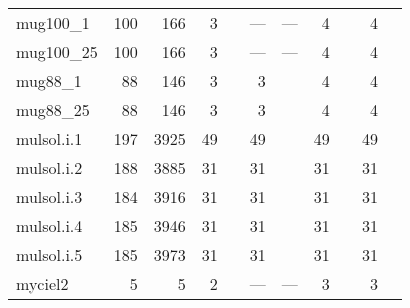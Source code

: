 \begin{longtable}{lrrrlrlrlrl}
  mug100\_1 & 100 & 166 & 3 & \cite{Malaguti2011} & --- & --- & 4 & \cite{Mendez-Diaz2006,Malaguti2011} & 4 & \cite{Malaguti2011,Mendez-Diaz2006,Brelaz1979,Sewell1996,Segundo2012} \\ 
  mug100\_25 & 100 & 166 & 3 & \cite{Malaguti2011} & --- & --- & 4 & \cite{Mendez-Diaz2006,Malaguti2011} & 4 & \cite{Malaguti2011,Mendez-Diaz2006,Brelaz1979,Sewell1996,Segundo2012} \\ 
  mug88\_1 & 88 & 146 & 3 & \cite{Malaguti2011,Gualandi2012} & 3 & \cite{Gualandi2012} & 4 & \cite{Mendez-Diaz2006,Malaguti2011,Gualandi2012} & 4 & \cite{Malaguti2011,Gualandi2012,Mendez-Diaz2006,Brelaz1979,Sewell1996,Segundo2012} \\ 
  mug88\_25 & 88 & 146 & 3 & \cite{Malaguti2011,Gualandi2012} & 3 & \cite{Gualandi2012} & 4 & \cite{Mendez-Diaz2006,Malaguti2011,Gualandi2012} & 4 & \cite{Mendez-Diaz2006,Malaguti2011,Gualandi2012,Mendez-Diaz2006,Brelaz1979,Sewell1996,Segundo2012} \\ 
  mulsol.i.1 & 197 & 3925 & 49 & \cite{Malaguti2011,Gualandi2012} & 49 & \cite{Gualandi2012} & 49 & \cite{Mehrotra1996,Malaguti2011,Gualandi2012,Mendez-Diaz2006} & 49 & \cite{Mehrotra1996,Malaguti2011,Gualandi2012,Mendez-Diaz2006,Brelaz1979,Sewell1996,Segundo2012} \\ 
  mulsol.i.2 & 188 & 3885 & 31 & \cite{Gualandi2012} & 31 & \cite{Gualandi2012} & 31 & \cite{Mehrotra1996,Gualandi2012,Malaguti2011,Mendez-Diaz2006} & 31 & \cite{Mehrotra1996,Gualandi2012,Malaguti2011,Mendez-Diaz2006,Brelaz1979,Sewell1996,Segundo2012} \\ 
  mulsol.i.3 & 184 & 3916 & 31 & \cite{Malaguti2011,Gualandi2012} & 31 & \cite{Gualandi2012} & 31 & \cite{Mehrotra1996,Malaguti2011,Gualandi2012,Mendez-Diaz2006} & 31 & \cite{Mehrotra1996,Malaguti2011,Gualandi2012,Mendez-Diaz2006,Brelaz1979,Sewell1996,Segundo2012} \\ 
  mulsol.i.4 & 185 & 3946 & 31 & \cite{Malaguti2011,Gualandi2012} & 31 & \cite{Gualandi2012} & 31 & \cite{Mehrotra1996,Malaguti2011,Gualandi2012,Mendez-Diaz2006} & 31 & \cite{Mehrotra1996,Malaguti2011,Gualandi2012,Mendez-Diaz2006,Brelaz1979,Sewell1996,Segundo2012} \\ 
  mulsol.i.5 & 185 & 3973 & 31 & \cite{Gualandi2012} & 31 & \cite{Gualandi2012} & 31 & \cite{Mehrotra1996,Malaguti2011,Gualandi2012,Mendez-Diaz2006} & 31 & \cite{Mehrotra1996,Malaguti2011,Gualandi2012,Mendez-Diaz2006,Brelaz1979,Sewell1996,Segundo2012} \\ 
  myciel2 & 5 & 5 & 2 & \cite{Malaguti2011} & --- & --- & 3 & \cite{Mehrotra1996} & 3 & \cite{Mehrotra1996} \\ 

\end{longtable}

